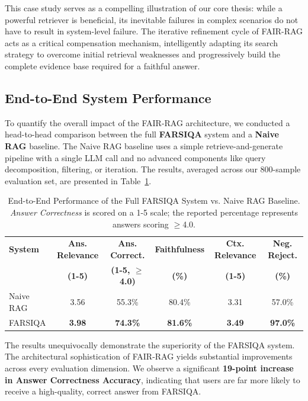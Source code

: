 \documentclass[11pt]{article}
\begin{document}
This case study serves as a compelling illustration of our core thesis: while a powerful retriever is beneficial, its inevitable failures in complex scenarios do not have to result in system-level failure. The iterative refinement cycle of FAIR-RAG acts as a critical compensation mechanism, intelligently adapting its search strategy to overcome initial retrieval weaknesses and progressively build the complete evidence base required for a faithful answer.

\subsection{End-to-End System Performance}

To quantify the overall impact of the FAIR-RAG architecture, we conducted a head-to-head comparison between the full \textbf{FARSIQA} system and a \textbf{Naive RAG} baseline. The Naive RAG baseline uses a simple retrieve-and-generate pipeline with a single LLM call and no advanced components like query decomposition, filtering, or iteration. The results, averaged across our 800-sample evaluation set, are presented in Table~\ref{tab:e2e-performance}.

\begin{table}[t]
\centering
\footnotesize
\begin{tabular}{lccccc}
\hline
\textbf{System} & \textbf{Ans. Relevance} & \textbf{Ans. Correct.} & \textbf{Faithfulness} & \textbf{Ctx. Relevance} & \textbf{Neg. Reject.} \\
& \textbf{(1-5)} & \textbf{(1-5, $\geq$4.0)} & \textbf{(\%)} & \textbf{(1-5)} & \textbf{(\%)} \\
\hline
Naive RAG & 3.56 & 55.3\% & 80.4\% & 3.31 & 57.0\% \\
FARSIQA & \textbf{3.98} & \textbf{74.3\%} & \textbf{81.6\%} & \textbf{3.49} & \textbf{97.0\%} \\
\hline
\end{tabular}
\caption{End-to-End Performance of the Full FARSIQA System vs. Naive RAG Baseline. \emph{Answer Correctness} is scored on a 1-5 scale; the reported percentage represents answers scoring $\geq$4.0.}
\label{tab:e2e-performance}
\end{table}

The results unequivocally demonstrate the superiority of the FARSIQA system. The architectural sophistication of FAIR-RAG yields substantial improvements across every evaluation dimension. We observe a significant \textbf{19-point increase in Answer Correctness Accuracy}, indicating that users are far more likely to receive a high-quality, correct answer from FARSIQA.
\end{document}
